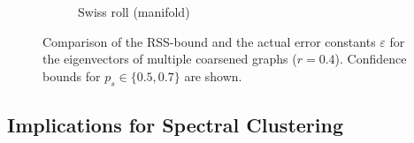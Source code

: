 \begin{figure}[ht]
\begin{subfigure}{0.33\textwidth}
		\caption{Swiss roll (manifold)}\label{fig:cons:example:roll}
	\end{subfigure}
	\caption{%
		Comparison of the RSS-bound and the actual error constants $\varepsilon$ for the eigenvectors of multiple coarsened graphs ($r = 0.4$).
		Confidence bounds for $p_s \in \{0.5, 0.7\}$ are shown.
	}\label{fig:cons:example}
\end{figure}

\subsection{Implications for Spectral Clustering}%
\label{sec:cons:sc}
